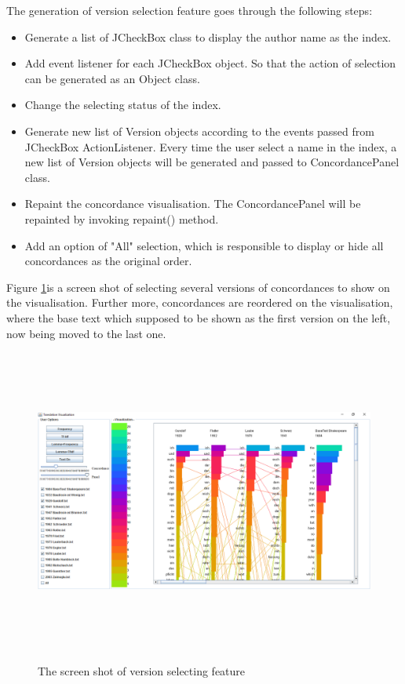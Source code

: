 The generation of version selection feature goes through the following steps:
\begin{itemize}
	\item \textbf{} Generate a list of JCheckBox class to display the author name as the index. 
	\item \textbf{} Add event listener for each JCheckBox object. So that the action of selection can be generated as an Object class.
	\item \textbf{} Change the selecting status of the index. 
	\item \textbf{} Generate new list of Version objects according to the events passed from JCheckBox ActionListener. Every time the user select a name in the index, a new list of Version objects will be generated and passed to ConcordancePanel class. 
	\item \textbf{} Repaint the concordance visualisation. The ConcordancePanel will be repainted by invoking repaint() method.
	\item \textbf{} Add an option of "All" selection, which is responsible to display or hide all concordances as the original order.
\end{itemize}

Figure \ref{fig:versionChoosDemo}is a screen shot of selecting several versions of concordances to show on the visualisation. Further more, concordances are reordered on the visualisation, where the base text which supposed to be shown as the first version on the left, now being moved to the last one.

\begin{figure}[H]
	\centering	
	\includegraphics[width=18cm, height=10cm]{Figs/Version-Selecting-Demo}\\[1ex]
	\caption{The screen shot of version selecting feature}
	\label{fig:versionChoosDemo}
\end{figure} 


